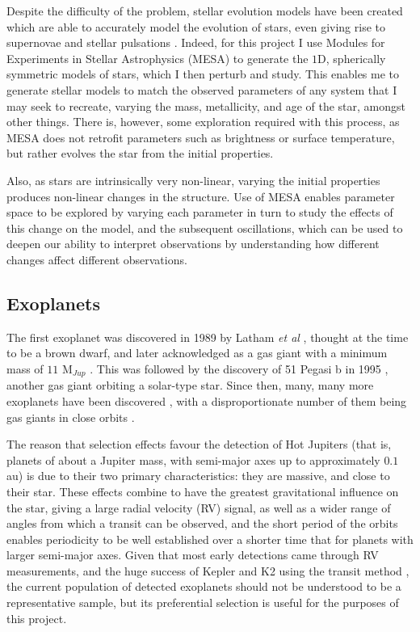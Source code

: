 \documentclass[11pt]{amsart}
\begin{document}
Despite the difficulty of the problem, stellar evolution models have been created which are able to accurately model the evolution of stars, even giving rise to supernovae and stellar pulsations \cite{Paxton2015}.  Indeed, for this project I use Modules for Experiments in Stellar Astrophysics (MESA) \cite{Paxton2011} to generate the $1$D, spherically symmetric models of stars, which I then perturb and study.  This enables me to generate stellar models to match the observed parameters of any system that I may seek to recreate, varying the mass, metallicity, and age of the star, amongst other things.  There is, however, some exploration required with this process, as MESA does not retrofit parameters such as brightness or surface temperature, but rather evolves the star from the initial properties.

Also, as stars are intrinsically very non-linear, varying the initial properties produces non-linear changes in the structure.  Use of MESA enables parameter space to be explored by varying each parameter in turn to study the effects of this change on the model, and the subsequent oscillations, which can be used to deepen our ability to interpret observations by understanding how different changes affect different observations.




\subsection{Exoplanets}

The first exoplanet was discovered in 1989 by Latham \textit{et al} \cite{Latham1989}, thought at the time to be a brown dwarf, and later acknowledged as a gas giant with a minimum mass of $11$ M$_{Jup}$ \cite{Wang2012}.  This was followed by the discovery of 51 Pegasi b in 1995 \cite{Mayor1995}, another gas giant orbiting a solar-type star.  Since then, many, many more exoplanets have been discovered \cite{NASAExoplanet}, with a disproportionate number of them being gas giants in close orbits \cite{Winn2014}.

The reason that selection effects favour the detection of Hot Jupiters (that is, planets of about a Jupiter mass, with semi-major axes up to approximately $0.1$ au) is due to their two primary characteristics: they are massive, and close to their star.  These effects combine to have the greatest gravitational influence on the star, giving a large radial velocity (RV) signal, as well as a wider range of angles from which a transit can be observed, and the short period of the orbits enables periodicity to be well established over a shorter time that for planets with larger semi-major axes.  Given that most early detections came through RV measurements, and the huge success of Kepler and K2 using the transit method \cite{Coughlin2016}, the current population of detected exoplanets should not be understood to be a representative sample, but its preferential selection is useful for the purposes of this project.
\end{document}
